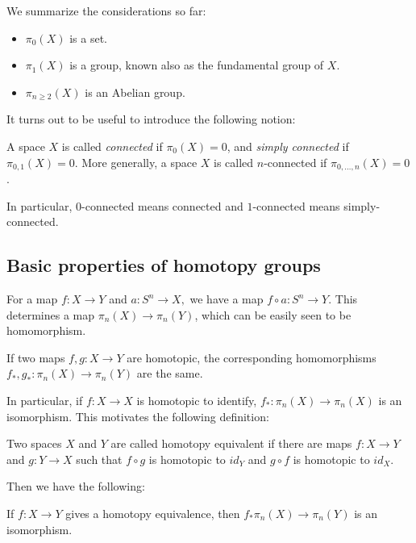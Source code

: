 \documentclass[12pt]{article}
\numberwithin{equation}{section}
\numberwithin{figure}{section}
\theoremstyle{remark}
\begin{document}
We summarize the considerations so far:
\begin{itemize}
\item $\pi_0(X)$ is a set.
\item $\pi_1(X)$ is a group, known also as the fundamental group of $X$.
\item $\pi_{n\ge 2}(X)$ is an Abelian group.
\end{itemize}

It turns out to be useful to introduce the following notion:
\begin{definition}
  \label{def:n-connected}
A space $X$ is called \emph{connected} if $\pi_0(X)=0$,
and \emph{simply connected} if $\pi_{0,1}(X)=0$.
More generally, a space $X$ is called $n$-connected 
if $\pi_{0,\ldots,n}(X)=0$.
\end{definition}
In particular, $0$-connected means connected
and $1$-connected means simply-connected.

\subsection{Basic properties of homotopy groups}

\begin{definition}
  For a map $f:X\to Y$ and $a:S^n \to X,$ we have a map $f\circ a:S^n\to Y$.
  This determines a map $\pi_n(X)\to \pi_n(Y)$,
  which can be easily seen to be  homomorphism.
\end{definition}

\begin{proposition}
  If two maps $f,g:X\to Y$ are homotopic,
  the corresponding homomorphisms $f_*,g_*:\pi_n(X)\to \pi_n(Y)$ are the same.
\end{proposition}

In particular, if $f:X\to X$ is homotopic to identify,
$f_*:\pi_n(X)\to \pi_n(X)$ is an isomorphism.
This motivates the following definition:

\begin{definition}
  Two spaces $X$ and $Y$ are called homotopy equivalent
  if there are maps $f:X\to Y$ and $g:Y\to X$ such that 
  $f\circ g$ is homotopic to $id_Y$  
  and $g\circ f$ is homotopic to $id_X$.
\end{definition}

Then we have the following:
\begin{proposition}
  If $f: X\to Y$ gives a homotopy equivalence,
  then $f_* \pi_n(X)\to \pi_n(Y)$ is an isomorphism.
\end{proposition}
  
\end{document}
